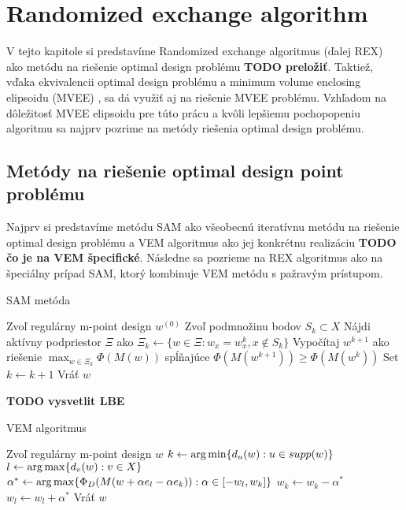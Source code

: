 \chapter{Randomized exchange algorithm}

V tejto kapitole si predstavíme Randomized exchange algoritmus \cite{rex_harman} (ďalej REX) ako metódu na riešenie optimal design problému \textbf{TODO preložiť}. Taktiež, vďaka ekvivalencii optimal design problému a minimum volume enclosing elipsoidu (MVEE) \cite{rex_harman}, sa dá využiť aj na riešenie MVEE problému.
Vzhľadom na dôležitosť MVEE elipsoidu pre túto prácu a kvôli lepšiemu pochopopeniu algoritmu sa najprv pozrime na metódy riešenia optimal design problému.

\section{Metódy na riešenie optimal design point problému}

Najprv si predstavíme metódu SAM ako všeobecnú iteratívnu metódu na riešenie optimal design problému a VEM algoritmus ako jej konkrétnu realizáciu \textbf{TODO čo je na VEM špecifické}. Následne sa pozrieme na REX algoritmus ako na špeciálny prípad SAM, ktorý kombinuje VEM metódu s pažravým prístupom.

\begin{algorithm}[H]
	\caption{SAM metóda \cite{rex_harman}}
	\label{sam}
	\begin{algorithmic}[1]
		\State Zvoľ regulárny m-point design $w^{(0)}$
			\State Zvoľ podmnožinu bodov $S_k \subset X$
			\State Nájdi aktívny podpriestor $\Xi$ ako $\Xi_k \leftarrow \{ w \in \Xi : w_x = w_x^k, x \not \in S_k \}$
			\State Vypočítaj $w^{k+1}$ ako riešenie $\max_{w \in \Xi_k} \Phi(M(w))$ spĺňajúce $\Phi(M(w^{k+1})) \geq \Phi(M(w^k))$
			\State Set $k \leftarrow k+1$
		\EndWhile
		\State Vráť $w$
	\end{algorithmic}
\end{algorithm}

\textbf{TODO vysvetlit LBE}

\begin{algorithm}[H]
	\caption{VEM algoritmus \cite{rex_harman}}
	\label{vem}
	\begin{algorithmic}[1]
		\State Zvoľ regulárny m-point design $w$
			\State $k \leftarrow \operatorname*{arg\,min} \{ d_u(w) : u \in supp(w)\}$
			\State $l \leftarrow \operatorname*{arg\,max} \{ d_v(w) : v \in X \}$
			\State $\alpha^* \leftarrow \operatorname*{arg\,max} \{ \Phi_D (M(w+\alpha e_l -\alpha e_k)) : \alpha \in [-w_l, w_k] \}$
			\State $w_k \leftarrow w_k - \alpha^*$
			\State $w_l \leftarrow w_l + \alpha^*$
		\EndWhile
		\State Vráť $w$
	\end{algorithmic}
\end{algorithm}

